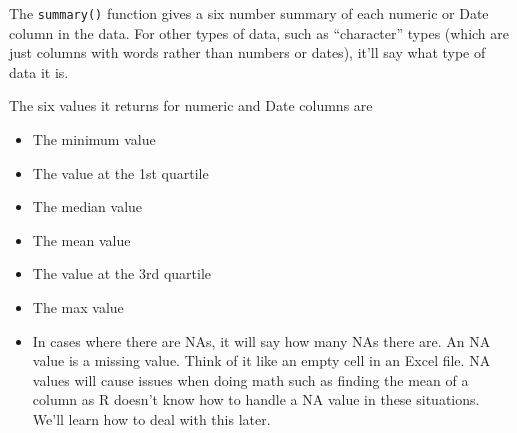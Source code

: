 \documentclass[
  12pt,
]{book}
\providecommand{\tightlist}{%
  \setlength{\itemsep}{0pt}\setlength{\parskip}{0pt}}
\begin{document}
The \texttt{summary()} function gives a six number summary of each numeric or Date column in the data. For other types of data, such as ``character'' types (which are just columns with words rather than numbers or dates), it'll say what type of data it is.

The six values it returns for numeric and Date columns are

\begin{itemize}
\tightlist
\item
  The minimum value
\item
  The value at the 1st quartile
\item
  The median value
\item
  The mean value
\item
  The value at the 3rd quartile
\item
  The max value
\item
  In cases where there are NAs, it will say how many NAs there are. An NA value is a missing value. Think of it like an empty cell in an Excel file. NA values will cause issues when doing math such as finding the mean of a column as R doesn't know how to handle a NA value in these situations. We'll learn how to deal with this later.
\end{itemize}
\end{document}
